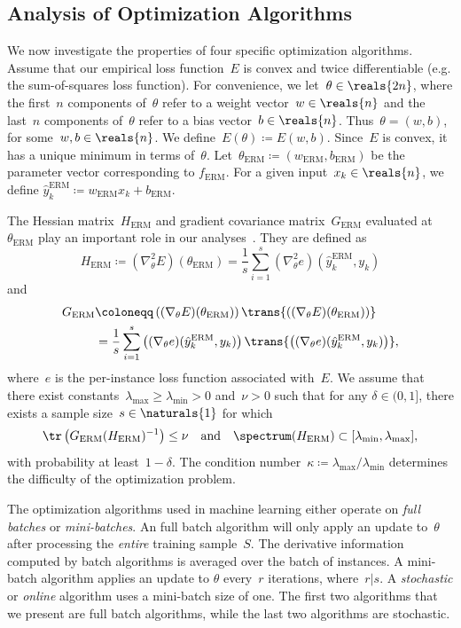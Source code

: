 \documentclass[11pt,a4paper]{article}
\numberwithin{equation}{section}
\begin{document}
\subsection{Analysis of Optimization Algorithms}

We now investigate the properties of four specific optimization algorithms.
Assume that our empirical loss function~$E$ is convex and twice differentiable
(e.g. the sum-of-squares loss function). For convenience, we let~$\theta \in
\reals{2n}$, where the first~$n$ components of~$\theta$ refer to a weight
vector~$w \in \reals{n}$ and the last~$n$ components of~$\theta$ refer to a bias
vector~$b \in \reals{n}$. Thus~$\theta = (w, b)$, for some~$w, b \in \reals{n}$.
We define~$E(\theta) \coloneqq E(w, b)$. Since~$E$ is convex, it has a unique
minimum in terms of~$\theta$. Let~$\theta_{\text{ERM}} \coloneqq
(w_{\text{ERM}}, b_{\text{ERM}})$ be the parameter vector corresponding to
$f_{\text{ERM}}$. For a given input~$x_k \in \reals{n}$, we define
$\hat{y}_k^{\text{ERM}} \coloneqq w_{\text{ERM}} x_k + b_{\text{ERM}}$.

The Hessian matrix~$H_{\text{ERM}}$ and gradient covariance
matrix~$G_{\text{ERM}}$ evaluated at~$\theta_{\text{ERM}}$ play an important
role in our analyses~\citep{bousquet2008tradeoffs}. They are defined as
\[
	H_{\text{ERM}} \coloneqq (\nabla_\theta^2 E)(\theta_{\text{ERM}})
	= \frac{1}{s} \sum_{i = 1}^s (\nabla_\theta^2 e)(\hat{y}_k^{\text{ERM}}, y_k)
\]
and
\begin{align*}
	G_{\text{ERM}}
	&\coloneqq \left((\nabla_\theta E)(\theta_{\text{ERM}})\right)
		\trans{\left((\nabla_\theta E)(\theta_{\text{ERM}})\right)} \\
	&= \frac{1}{s} \sum_{i = 1}^s
		\left((\nabla_\theta e)(\hat{y}_k^{\text{ERM}}, y_k)\right)
		\trans{\left((\nabla_\theta e)(\hat{y}_k^{\text{ERM}}, y_k)\right)},
\end{align*}
where~$e$ is the per-instance loss function associated with~$E$. We assume that
there exist constants~$\lambda_{\text{max}} \geq \lambda_{\text{min}} > 0$
and~$\nu > 0$ such that for any $\delta \in (0, 1]$, there exists a sample
size~$s \in \naturals{1}$ for which
\[
	\tr\left( G_{\text{ERM}} (H_{\text{ERM}})^{-1} \right) \leq \nu
	\quad\text{and}\quad
	\spectrum(H_{\text{ERM}}) \subset [\lambda_{\text{min}}, \lambda_{\text{max}}],
\]
with probability at least~$1 - \delta$. The condition number~$\kappa \coloneqq
\lambda_{\text{max}}/{\lambda_{\text{min}}}$ determines the difficulty of the
optimization problem.

The optimization algorithms used in machine learning either operate on
\emph{full batches} or \emph{mini-batches}. An full batch algorithm will only
apply an update to~$\theta$ after processing the \emph{entire} training
sample~$S$. The derivative information computed by batch algorithms is averaged
over the batch of instances. A mini-batch algorithm applies an update to
$\theta$ every~$r$ iterations, where~$r | s$. A \emph{stochastic} or
\emph{online} algorithm uses a mini-batch size of one. The first two algorithms
that we present are full batch algorithms, while the last two algorithms are
stochastic.
\end{document}
